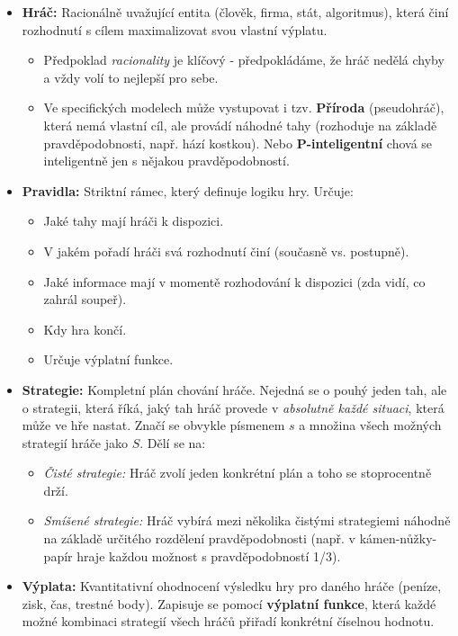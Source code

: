 \begin{itemize}
    \item \textbf{Hráč:}
    Racionálně uvažující entita (člověk, firma, stát, algoritmus), která činí rozhodnutí s cílem maximalizovat svou vlastní výplatu. 
    \begin{itemize}
        \item Předpoklad \textit{racionality} je klíčový - předpokládáme, že hráč nedělá chyby a vždy volí to nejlepší pro sebe.
        \item Ve specifických modelech může vystupovat i tzv. \textbf{Příroda} (pseudohráč), která nemá vlastní cíl, ale provádí náhodné tahy (rozhoduje na základě pravděpodobnosti, např. hází kostkou). Nebo \textbf{P-inteligentní} chová se inteligentně jen s nějakou pravděpodobností.
    \end{itemize}

    \item \textbf{Pravidla:}
    Striktní rámec, který definuje logiku hry. Určuje:
    \begin{itemize}
        \item Jaké tahy mají hráči k dispozici.
        \item V jakém pořadí hráči svá rozhodnutí činí (současně vs. postupně).
        \item Jaké informace mají v momentě rozhodování k dispozici (zda vidí, co zahrál soupeř).
        \item Kdy hra končí.
        \item Určuje výplatní funkce.
    \end{itemize}

    \item \textbf{Strategie:}
    Kompletní plán chování hráče. Nejedná se o pouhý jeden tah, ale o strategii, která říká, jaký tah hráč provede v \textit{absolutně každé situaci}, která může ve hře nastat. Značí se obvykle písmenem $s$ a množina všech možných strategií hráče jako $S$. Dělí se na:
    \begin{itemize}
        \item \textit{Čisté strategie:} Hráč zvolí jeden konkrétní plán a toho se stoprocentně drží.
        \item \textit{Smíšené strategie:} Hráč vybírá mezi několika čistými strategiemi náhodně na základě určitého rozdělení pravděpodobnosti (např. v kámen-nůžky-papír hraje každou možnost s pravděpodobností 1/3).
    \end{itemize}

    \item \textbf{Výplata:}
    Kvantitativní ohodnocení výsledku hry pro daného hráče (peníze, zisk, čas, trestné body). Zapisuje se pomocí \textbf{výplatní funkce}, která každé možné kombinaci strategií všech hráčů přiřadí konkrétní číselnou hodnotu.
\end{itemize}

